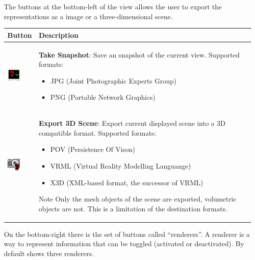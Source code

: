 The buttons at the bottom-left of the view allows the user to export the representations as a image
or a three-dimensional scene.\\
\vspace{0.2cm}

\begin{tabular}{| m{1.3cm} | m{12cm} |}
\hline
\textbf{Button} & \textbf{Description}\\
\hline
\includegraphics[width=0.7cm]{../../frontend/rsc/snapshot_scene} & 
\textbf{Take Snapshot}: Save an snapshot of the current view. Supported formats:
\begin{itemize}
\item JPG (Joint Photographic Experts Group)
\item PNG (Portable Network Graphics)
\end{itemize}\\
\hline
\includegraphics[width=0.7cm]{../../frontend/rsc/export_scene} &
\textbf{Export 3D Scene}: Export current displayed scene into a 3D compatible format. Supported formats:
\begin{itemize}
\item POV (Persistence Of Vison)
\item VRML (Virtual Reality Modelling Languange)
\item X3D (XML-based format, the successor of VRML)
\end{itemize}
\begin{bclogo}[couleur = yellow!33, logo=\bcattention]
{Note} Only the mesh objects of the scene are exported, volumetric objects are not. This is a limitation of the destination formats.
\end{bclogo}\\
\hline
\end{tabular}
\vspace{0.3cm} 

On the bottom-right there is the set of buttons called ``renderers''. A renderer is
a way to represent information that can be toggled (activated or deactivated). By
default \espina{} shows three renderers.

